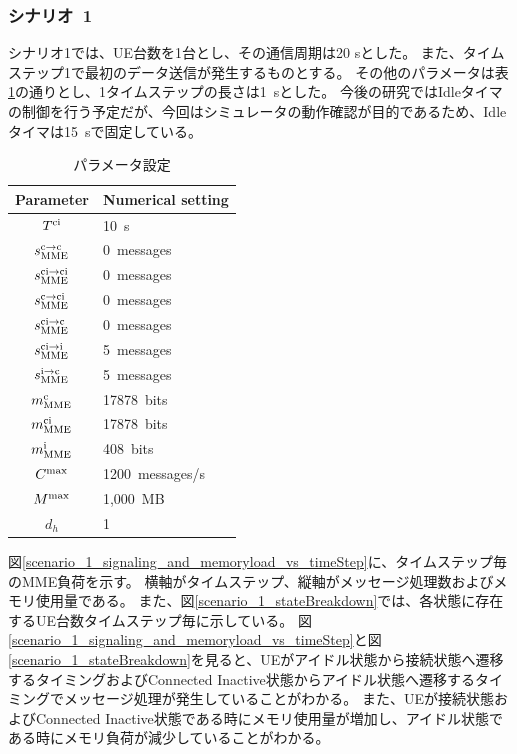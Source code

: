\documentclass[a4j]{ujarticle}
\begin{document}
\subsubsection{シナリオ~1}
シナリオ1では、UE台数を1台とし、その通信周期は20 sとした。
また、タイムステップ1で最初のデータ送信が発生するものとする。
その他のパラメータは表\ref{table:parameter}の通りとし、1タイムステップの長さは1~sとした。
今後の研究ではIdleタイマの制御を行う予定だが、今回はシミュレータの動作確認が目的であるため、Idleタイマは15~sで固定している。
\begin{table}[]
  \centering
  \caption{パラメータ設定}
  \label{table:parameter}
  \begin{tabular}{c|l}
    \hline
    Parameter  & Numerical setting \\\hline \hline
    $T^{\rm ci}$ & 10~s\\
    $s_{\rm MME}^{\rm c \to \rm c}$ & 0~messages\\
    $s_{\rm MME}^{\rm ci \to \rm ci}$ & 0~messages\\
    $s_{\rm MME}^{\rm c \to \rm ci}$ & 0~messages\\
    $s_{\rm MME}^{\rm ci \to \rm c}$ & 0~messages\\
    $s_{\rm MME}^{\rm ci \to \rm i}$ & 5~messages\\
    $s_{\rm MME}^{\rm i \to \rm c}$ & 5~messages\\
    $m^{\rm c}_{\rm MME}$ & 17878~bits\\
    $m^{\rm ci}_{\rm MME}$ & 17878~bits\\
    $m^{\rm i}_{\rm MME}$ & 408~bits\\
    $C^{\rm max}$ & 1200~messages/s\\
    $M^{\rm max}$ & 1,000~MB\\
    $d_h$ & 1 \\\hline
  \end{tabular}
\end{table}

図\ref{scenario_1_signaling_and_memoryload_vs_timeStep}に、タイムステップ毎のMME負荷を示す。
横軸がタイムステップ、縦軸がメッセージ処理数およびメモリ使用量である。
また、図\ref{scenario_1_stateBreakdown}では、各状態に存在するUE台数タイムステップ毎に示している。
図\ref{scenario_1_signaling_and_memoryload_vs_timeStep}と図\ref{scenario_1_stateBreakdown}を見ると、UEがアイドル状態から接続状態へ遷移するタイミングおよびConnected Inactive状態からアイドル状態へ遷移するタイミングでメッセージ処理が発生していることがわかる。
また、UEが接続状態およびConnected Inactive状態である時にメモリ使用量が増加し、アイドル状態である時にメモリ負荷が減少していることがわかる。
\end{document}
